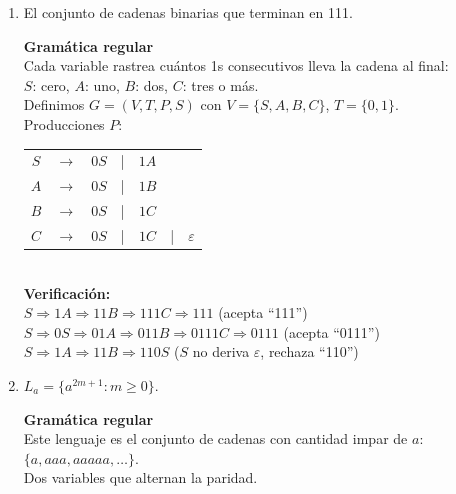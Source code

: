 \documentclass[12pt]{article}
\newcommand{\Aspace}{0.2cm}
\begin{document}
\begin{enumerate}
    \item El conjunto de cadenas binarias que terminan en 111.
        \vspace{\Aspace} \par
        { \color{azul}
            \textbf{Gramática regular} \\
            Cada variable rastrea cuántos 1s consecutivos lleva la cadena al final: \\
            $S$: cero, $A$: uno, $B$: dos, $C$: tres o más. \\

            Definimos $G = (V, T, P, S)$ con $V = \{ S, A, B, C \}$, $T = \{ 0, 1 \}$. \\
            Producciones $P$: \\
            \begin{tabular}{ccccccc}
                $S$ & $\rightarrow$ & $0S$ & | & $1A$ && \\
                $A$ & $\rightarrow$ & $0S$ & | & $1B$ && \\
                $B$ & $\rightarrow$ & $0S$ & | & $1C$ && \\
                $C$ & $\rightarrow$ & $0S$ & | & $1C$ & | & $\varepsilon$ \\
            \end{tabular} \\

            \textbf{Verificaci\'on:} \\
            $S \Rightarrow 1A \Rightarrow 11B \Rightarrow 111C \Rightarrow 111$ \quad (acepta ``111'') \\
            $S \Rightarrow 0S \Rightarrow 01A \Rightarrow 011B \Rightarrow 0111C \Rightarrow 0111$ \quad (acepta ``0111'') \\
            $S \Rightarrow 1A \Rightarrow 11B \Rightarrow 110S$ \quad ($S$ no deriva $\varepsilon$, rechaza ``110'')
        }


    \item $L_{a} = \{a^{2m + 1}: m \geq 0\}$.
        \vspace{\Aspace} \par
        { \color{azul} 
            \textbf{Gramática regular} \\
            Este lenguaje es el conjunto de cadenas con cantidad impar de $a$: $\{ a, aaa, aaaaa, \ldots \}$. \\
            Dos variables que alternan la paridad. \\

}
\end{enumerate}
\end{document}
